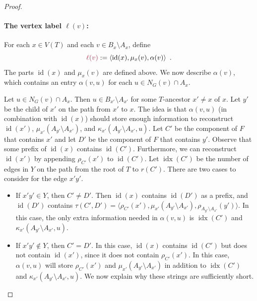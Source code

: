 \documentclass{patmorin}
\makeatletter
\DeclareMathOperator{\id}{id}
\newcommand{\defin}[1]{\emph{\textcolor{brightmaroon}{#1}}}
\def\mathcolor#1#{\@mathcolor{#1}}
\def\@mathcolor#1#2#3{%
  \protect\leavevmode
  \begingroup
    \color#1{#2}#3%
  \endgroup
}
\newcommand{\mathdefin}[1]{\mathcolor{brightmaroon}{#1}}
\DeclareMathOperator{\idx}{idx}
\makeatother
\begin{document}
\begin{proof}
  \paragraph{\boldmath The vertex label $\ell(v)$:}

  For each $x\in V(T)$ and each $v\in B_x\setminus A_x$, define
  \[
    \mathdefin{\ell(v)} := \langle \id(x), \mu_x(v),\alpha(v)\rangle \enspace .
  \]
  The parts $\id(x)$ and $\mu_x(v)$ are defined above. We now describe $\alpha(v)$, which contains an entry $\alpha(v,u)$ for each $u\in N_G(v)\cap A_x$.  
  
  
  Let $u\in N_G(v)\cap A_x$.  Then $u\in B_{x'}\setminus A_{x'}$ for some $T$-ancestor $x'\neq x$ of $x$. Let $y'$ be the child of $x'$ on the path from $x'$ to $x$. The idea is that $\alpha(v,u)$ (in combination with $\id(x)$) should store enough information to reconstruct $\id(x')$, $\mu_{x'}(A_{y'}\setminus A_{x'})$, and $\kappa_{x'}(A_{y'}\setminus A_{x'},u)$.  Let $C'$ be the component of $F$ that contains $x'$ and let $D'$ be the component of $F$ that contains $y'$.  Observe that some prefix of $\id(x)$ contains $\id(C')$.  Furthermore, we can reconstruct $\id(x')$ by appending $\rho_{C'}(x')$ to $\id(C')$.  Let \defin{$\idx(C')$} be the number of edges in $Y$ on the path from the root of $T$ to $r(C')$. There are two cases to consider for the edge $x'y'$.   
  \begin{itemize}
    \item If $x'y'\in Y$, then $C'\neq D'$.  Then $\id(x)$ contains $\id(D')$ as a prefix, and $\id(D')$ contains $\tau(C',D')=\langle \rho_{C'}(x'), \mu_{x'}(A_{y'}\setminus A_{x'}), \rho_{A_{y'}\setminus A_{x'}}(y') \rangle$.  In this case, the only extra information needed in $\alpha(v,u)$ is $\idx(C')$ and $\kappa_{x'}(A_{y'}\setminus A_{x'}, u)$.  

    \item If $x'y'\not\in Y$, then $C'=D'$. In this case, $\id(x)$ contains $\id(C')$ but does not contain $\id(x')$, since it does not contain $\rho_{C'}(x')$.  In this case, $\alpha(v,u)$ will store $\rho_{C'}(x')$ and $\mu_{x'}(A_{y'}\setminus A_{x'})$ in addition to $\idx(C')$ and $\kappa_{x'}(A_{y'}\setminus A_{x'}, u)$.  We now explain why these strings are sufficiently short.
    

\end{itemize}
\end{proof}
\end{document}
